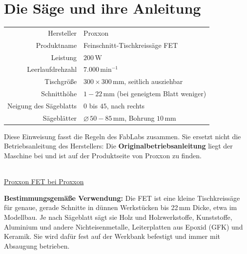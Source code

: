 \documentclass{\basedir/fablab-document}
\begin{document}

	\newpage


	\renewcommand{\contentsname}{Inhaltsverzeichnis / Arbeitsablauf}
	\setcounter{tocdepth}{2}
	\tableofcontents
	\newpage

	\section{Die Säge und ihre Anleitung}

	\begin{center}
		\begin{tabular}{r|l}
			Hersteller & Proxxon \\
			Produktname & Feinschnitt-Tischkreissäge FET \\
			Leistung & $200\,\mathrm{W}$ \\
			Leerlaufdrehzahl & $7.000\,\mathrm{min}^{-1}$ \\
			Tischgröße & $300 \times 300\,\mathrm{mm}$, seitlich ausziehbar \\
			Schnitthöhe & $1 - 22\,\mathrm{mm}$ (bei geneigtem Blatt weniger) \\
			Neigung des Sägeblatts & $0$\textdegree{} bis $45$\textdegree, nach rechts \\
			Sägeblätter & $\varnothing\,50 - 85\,\mathrm{mm}$, Bohrung $10\,\mathrm{mm}$ \\
		\end{tabular}
	\end{center}

	Diese Einweisung fasst die Regeln des FabLabs zusammen. Sie ersetzt nicht die Betriebsanleitung des Herstellers: Die \textbf{Originalbetriebsanleitung} liegt der Maschine bei und ist auf der Produktseite von Proxxon zu finden.

	\begin{center}
		\\[1mm]
		\href{https://www.proxxon.com/de/micromot/27070.php}{Proxxon FET bei Proxxon}
	\end{center}

	\textbf{Bestimmungsgemäße Verwendung:} Die FET ist eine kleine Tischkreissäge für genaue, gerade Schnitte in dünnen Werkstücken bis 22\,mm Dicke, etwa im Modellbau. Je nach Sägeblatt sägt sie Holz und Holzwerkstoffe, Kunststoffe, Aluminium und andere Nichteisenmetalle, Leiterplatten aus Epoxid (GFK) und Keramik. Sie wird dafür fest auf der Werkbank befestigt und immer mit Absaugung betrieben.
\end{document}
